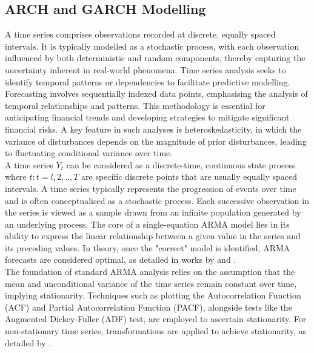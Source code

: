 \documentclass[oneside,12pt]{CUEDthesisPSnPDF}
\newcommand{\textcite}{\citet}
\begin{document}

\subsection{ARCH and GARCH Modelling}
\noindent
A time series comprises observations recorded at discrete, equally spaced intervals. It is typically modelled as a stochastic process, with each observation influenced by both deterministic and random components, thereby capturing the uncertainty inherent in real-world phenomena. Time series analysis seeks to identify temporal patterns or dependencies to facilitate predictive modelling. Forecasting involves sequentially indexed data points, emphasising the analysis of temporal relationships and patterns. This methodology is essential for anticipating financial trends and developing strategies to mitigate significant financial risks. A key feature in such analyses is heteroskedasticity, in which the variance of disturbances depends on the magnitude of prior disturbances, leading to fluctuating conditional variance over time.\\

A time series \({Y_t}\) can be considered as a discrete-time, continuous state process where \(t: t=l, 2, .., T\) are specific discrete points that are usually equally spaced intervals. A time series typically represents the progression of events over time and is often conceptualised as a stochastic process. Each successive observation in the series is viewed as a sample drawn from an infinite population generated by an underlying process. The core of a single-equation ARMA model lies in its ability to express the linear relationship between a given value in the series and its preceding values. In theory, once the "correct" model is identified, ARMA forecasts are considered optimal, as detailed in works by \textcite{BoxJenkins1976} and \textcite{pankratz1991forecasting}.\\

The foundation of standard ARMA analysis relies on the assumption that the mean and unconditional variance of the time series remain constant over time, implying stationarity. Techniques such as plotting the Autocorrelation Function (ACF) and Partial Autocorrelation Function (PACF), alongside tests like the Augmented Dickey-Fuller (ADF) test, are employed to ascertain stationarity. For non-stationary time series, transformations are applied to achieve stationarity, as detailed by \textcite{pankratz1991forecasting}.\\
\end{document}
